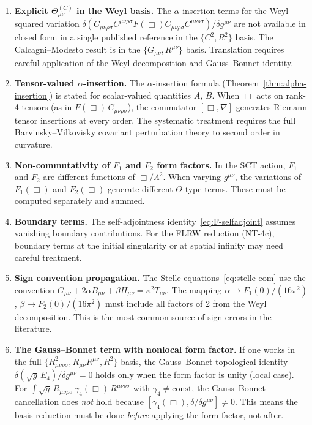 \documentclass[12pt,a4paper]{article}
\theoremstyle{definition}
\theoremstyle{remark}
\newcommand{\Ricsq}{R_{\mu\nu}R^{\mu\nu}}
\newcommand{\Weylsq}{C_{\mu\nu\rho\sigma}C^{\mu\nu\rho\sigma}}
\begin{document}
\begin{enumerate}[label=\textbf{G\arabic*.}]
\item \textbf{Explicit $\Theta_{\mu\nu}^{(C)}$ in the Weyl basis.}
  The $\alpha$-insertion terms for the Weyl-squared variation
  $\delta(\Weylsq F(\Box)\Weylsq)/\delta g^{\mu\nu}$ are not
  available in closed form in a single published reference in the
  $\{C^2, R^2\}$ basis.  The Calcagni--Modesto result is in the
  $\{G_{\mu\nu}, R^{\mu\nu}\}$ basis.  Translation requires
  careful application of the Weyl decomposition and Gauss--Bonnet
  identity.

\item \textbf{Tensor-valued $\alpha$-insertion.}
  The $\alpha$-insertion formula (Theorem~\ref{thm:alpha-insertion}) is
  stated for scalar-valued quantities $A$, $B$.  When $\Box$ acts on
  rank-4 tensors (as in $F(\Box)\,C_{\mu\nu\rho\sigma}$), the
  commutator $[\Box, \nabla]$ generates Riemann tensor insertions at
  every order.  The systematic treatment requires the full
  Barvinsky--Vilkovisky covariant perturbation theory to second order
  in curvature.

\item \textbf{Non-commutativity of $F_1$ and $F_2$ form factors.}
  In the SCT action, $F_1$ and $F_2$ are different functions of
  $\Box/\Lambda^2$.  When varying $g^{\mu\nu}$, the variations of
  $F_1(\Box)$ and $F_2(\Box)$ generate different $\Theta$-type terms.
  These must be computed separately and summed.

\item \textbf{Boundary terms.}
  The self-adjointness identity~\eqref{eq:F-selfadjoint} assumes
  vanishing boundary contributions.  For the FLRW reduction (NT-4c),
  boundary terms at the initial singularity or at spatial infinity
  may need careful treatment.

\item \textbf{Sign convention propagation.}
  The Stelle equations~\eqref{eq:stelle-eom} use the convention
  $G_{\mu\nu} + 2\alpha B_{\mu\nu} + \beta H_{\mu\nu} = \kappa^2 T_{\mu\nu}$.
  The mapping $\alpha \to F_1(0)/(16\pi^2)$,
  $\beta \to F_2(0)/(16\pi^2)$ must include all factors of 2 from the
  Weyl decomposition.  This is the most common source of sign errors
  in the literature.

\item \textbf{The Gauss--Bonnet term with nonlocal form factor.}
  If one works in the full $\{R_{\mu\nu\rho\sigma}^2, \Ricsq, R^2\}$
  basis, the Gauss--Bonnet topological identity
  $\delta(\sqrt{g}\,E_4)/\delta g^{\mu\nu} = 0$ holds only when the
  form factor is unity (local case).  For
  $\int\sqrt{g}\,R_{\mu\nu\rho\sigma}\,\gamma_4(\Box)\,R^{\mu\nu\rho\sigma}$
  with $\gamma_4 \neq \text{const}$, the Gauss--Bonnet cancellation
  does \emph{not} hold because $[\gamma_4(\Box), \delta/\delta g^{\mu\nu}]
  \neq 0$.  This means the basis reduction must be done \emph{before}
  applying the form factor, not after.


\end{enumerate}
\end{document}
